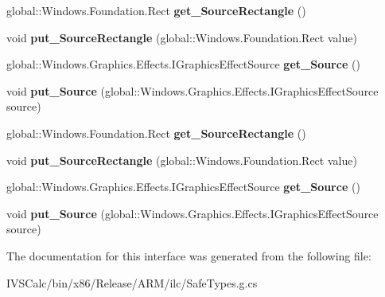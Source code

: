 \begin{DoxyCompactItemize}
global\+::\+Windows.\+Foundation.\+Rect {\bfseries get\+\_\+\+Source\+Rectangle} ()
\item 
\mbox{\label{interface_microsoft_1_1_graphics_1_1_canvas_1_1_effects_1_1_i_tile_effect_a0b1dc0ce9ccf89dff8028193fabe0e72}} 
void {\bfseries put\+\_\+\+Source\+Rectangle} (global\+::\+Windows.\+Foundation.\+Rect value)
\item 
\mbox{\label{interface_microsoft_1_1_graphics_1_1_canvas_1_1_effects_1_1_i_tile_effect_a0342b675b2b69f003523489bb2794c0b}} 
global\+::\+Windows.\+Graphics.\+Effects.\+I\+Graphics\+Effect\+Source {\bfseries get\+\_\+\+Source} ()
\item 
\mbox{\label{interface_microsoft_1_1_graphics_1_1_canvas_1_1_effects_1_1_i_tile_effect_a0ef03014fc410a579000361d151b047c}} 
void {\bfseries put\+\_\+\+Source} (global\+::\+Windows.\+Graphics.\+Effects.\+I\+Graphics\+Effect\+Source source)
\item 
\mbox{\label{interface_microsoft_1_1_graphics_1_1_canvas_1_1_effects_1_1_i_tile_effect_a9987fc9d39e785ca4580a828c0e585b6}} 
global\+::\+Windows.\+Foundation.\+Rect {\bfseries get\+\_\+\+Source\+Rectangle} ()
\item 
\mbox{\label{interface_microsoft_1_1_graphics_1_1_canvas_1_1_effects_1_1_i_tile_effect_a0b1dc0ce9ccf89dff8028193fabe0e72}} 
void {\bfseries put\+\_\+\+Source\+Rectangle} (global\+::\+Windows.\+Foundation.\+Rect value)
\item 
\mbox{\label{interface_microsoft_1_1_graphics_1_1_canvas_1_1_effects_1_1_i_tile_effect_a0342b675b2b69f003523489bb2794c0b}} 
global\+::\+Windows.\+Graphics.\+Effects.\+I\+Graphics\+Effect\+Source {\bfseries get\+\_\+\+Source} ()
\item 
\mbox{\label{interface_microsoft_1_1_graphics_1_1_canvas_1_1_effects_1_1_i_tile_effect_a0ef03014fc410a579000361d151b047c}} 
void {\bfseries put\+\_\+\+Source} (global\+::\+Windows.\+Graphics.\+Effects.\+I\+Graphics\+Effect\+Source source)
\end{DoxyCompactItemize}


The documentation for this interface was generated from the following file\+:\begin{DoxyCompactItemize}
\item 
I\+V\+S\+Calc/bin/x86/\+Release/\+A\+R\+M/ilc/Safe\+Types.\+g.\+cs\end{DoxyCompactItemize}
